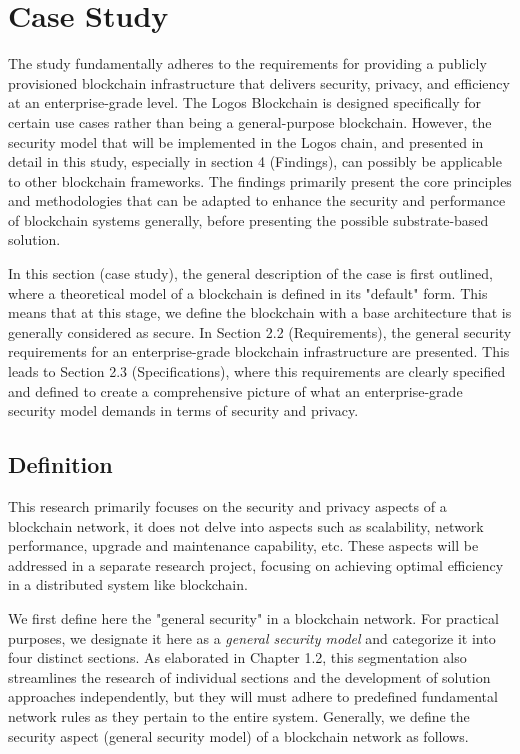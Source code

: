 \section{Case Study}
The study fundamentally adheres to the requirements for providing a publicly provisioned blockchain infrastructure that delivers security, privacy, and efficiency at an enterprise-grade level. The Logos Blockchain is designed specifically for certain use cases rather than being a general-purpose blockchain. However, the security model that will be implemented in the Logos chain, and presented in detail in this study, especially in section 4 (Findings), can possibly be applicable to other blockchain frameworks. The findings primarily present the core principles and methodologies that can be adapted to enhance the security and performance of blockchain systems generally, before presenting the possible substrate-based solution. 

In this section (case study), the general description of the case is first outlined, where a theoretical model of a blockchain is defined in its "default" form. This means that at this stage, we define the blockchain with a base architecture that is generally considered as secure. In Section 2.2 (Requirements), the general security requirements for an enterprise-grade blockchain infrastructure are presented. This leads to Section 2.3 (Specifications), where this requirements are clearly specified and defined to create a comprehensive picture of what an enterprise-grade security model demands in terms of security and privacy.

\subsection{Definition}
This research primarily focuses on the security and privacy aspects of a  blockchain network, it does not delve into aspects such as scalability, network performance, upgrade and maintenance capability, etc. These aspects will be addressed in a separate research project, focusing on achieving optimal efficiency in a distributed system like blockchain.

We first define here the "general security" in a blockchain network. For practical purposes, we designate it here as a \textit{general security model} and categorize it into four distinct sections. As elaborated in Chapter 1.2, this segmentation also streamlines the research of individual sections and the development of solution approaches independently, but they will must adhere to predefined fundamental network rules as they pertain to the entire system. Generally, we define the security aspect (general security model) of a blockchain network as follows.

